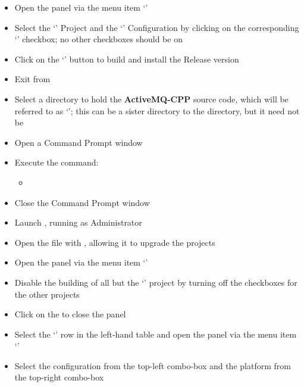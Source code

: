 \begin{itemize}
\item\exSp{}Open the  panel via the menu item
`'
\item\exSp{}Select the `' Project and the `'
Configuration by clicking on the corresponding `' checkbox; no other
checkboxes should be on
\item\exSp{}Click on the `' button to build and install the Release
version
\item\exSp{}Exit from 
\item\exSp{}Select a directory to hold the \textbf{ActiveMQ-CPP} source code, which will
be referred to as `'; this can be a sister directory to the
 directory, but it need not be
\item\exSp{}Open a Command Prompt window
\item\exSp{}Execute the command:
\begin{itemize}
\item{}
\end{itemize}
\item\exSp{}Close the Command Prompt window
\item\exSp{}Launch , running as Administrator
\item\exSp{}Open the file
 with , allowing it to upgrade the
projects
\item\exSp{}Open the  panel via the menu item
`'
\item\exSp{}Disable the building of all but the `' project by turning
off the  checkboxes for the other projects
\item\exSp{}Click on the  to close the  panel
\item\exSp{}Select the `' row in the left-hand table and open the
 panel via the menu item
`'
\item\exSp{}Select the  configuration from the top-left
combo-box and the  platform from the top-right combo-box

\end{itemize}
